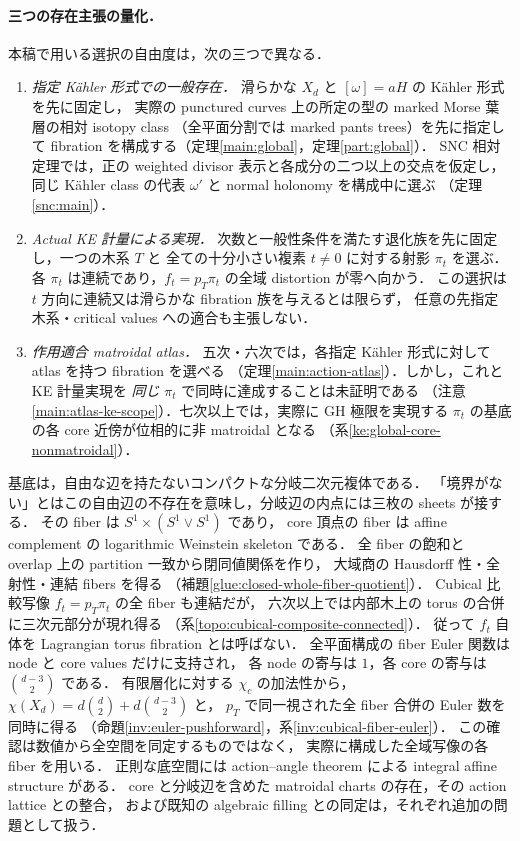 \paragraph{三つの存在主張の量化．}\label{intro:existence-scopes}
本稿で用いる選択の自由度は，次の三つで異なる．
\begin{enumerate}
\item \emph{指定 Kähler 形式での一般存在．}
滑らかな $X_d$ と $[\omega]=aH$ の Kähler 形式を先に固定し，
実際の punctured curves 上の所定の型の marked Morse 葉層の相対 isotopy class
（全平面分割では marked pants trees）を先に指定して
fibration を構成する（定理\ref{main:global}，定理\ref{part:global}）．
SNC 相対定理では，正の weighted divisor 表示と各成分の二つ以上の交点を仮定し，
同じ Kähler class の代表 $\omega'$ と normal holonomy を構成中に選ぶ
（定理\ref{snc:main}）．
\item \emph{Actual KE 計量による実現．}
次数と一般性条件を満たす退化族を先に固定し，一つの木系 $T$ と
全ての十分小さい複素 $t\ne0$ に対する射影 $\pi_t$ を選ぶ．
各 $\pi_t$ は連続であり，$f_t=p_T\pi_t$ の全域 distortion が零へ向かう．
この選択は $t$ 方向に連続又は滑らかな fibration 族を与えるとは限らず，
任意の先指定木系・critical values への適合も主張しない．
\item \emph{作用適合 matroidal atlas．}
五次・六次では，各指定 Kähler 形式に対して atlas を持つ fibration を選べる
（定理\ref{main:action-atlas}）．しかし，これと KE 計量実現を
\emph{同じ} $\pi_t$ で同時に達成することは未証明である
（注意\ref{main:atlas-ke-scope}）．七次以上では，実際に GH 極限を実現する
$\pi_t$ の基底の各 core 近傍が位相的に非 matroidal となる
（系\ref{ke:global-core-nonmatroidal}）．
\end{enumerate}

基底は，自由な辺を持たないコンパクトな分岐二次元複体である．
「境界がない」とはこの自由辺の不存在を意味し，分岐辺の内点には三枚の sheets が接する．
その fiber は $S^1\times(S^1\vee S^1)$ であり，
core 頂点の fiber は affine complement の logarithmic Weinstein skeleton である．
全 fiber の飽和と overlap 上の partition 一致から閉同値関係を作り，
大域商の Hausdorff 性・全射性・連結 fibers を得る
（補題\ref{glue:closed-whole-fiber-quotient}）．
Cubical 比較写像 $f_t=p_T\pi_t$ の全 fiber も連結だが，
六次以上では内部木上の torus の合併に三次元部分が現れ得る
（系\ref{topo:cubical-composite-connected}）．
従って $f_t$ 自体を Lagrangian torus fibration とは呼ばない．
全平面構成の fiber Euler 関数は node と core values だけに支持され，
各 node の寄与は $1$，各 core の寄与は $\binom{d-3}{2}$ である．
有限層化に対する $\chi_c$ の加法性から，
$\chi(X_d)=d\binom d2+d\binom{d-3}{2}$ と，
$p_T$ で同一視された全 fiber 合併の Euler 数を同時に得る
（命題\ref{inv:euler-pushforward}，系\ref{inv:cubical-fiber-euler}）．
この確認は数値から全空間を同定するものではなく，
実際に構成した全域写像の各 fiber を用いる．
正則な底空間には action--angle theorem による integral affine structure がある．
core と分岐辺を含めた matroidal charts の存在，その action lattice との整合，
および既知の algebraic filling との同定は，それぞれ追加の問題として扱う．

